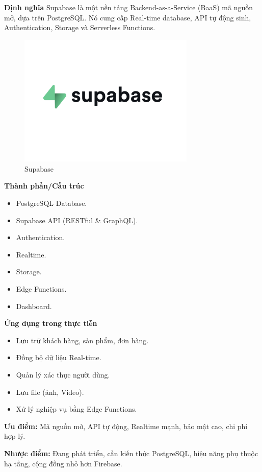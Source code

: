 \textbf{Định nghĩa}
Supabase là một nền tảng Backend-as-a-Service (BaaS) mã nguồn mở, dựa trên PostgreSQL. Nó cung cấp Real-time database, API tự động sinh, Authentication, Storage và Serverless Functions.
\begin{figure}[h!]
    \centering
    \includegraphics[width=0.75\textwidth]{img/Picture8.png}
    
    \caption{Supabase}
    \label{fig:supabase}
\end{figure}
\textbf{Thành phần/Cấu trúc}
\begin{itemize}
    \item PostgreSQL Database.
    \item Supabase API (RESTful \& GraphQL).
    \item Authentication.
    \item Realtime.
    \item Storage.
    \item Edge Functions.
    \item Dashboard.
\end{itemize}

\textbf{Ứng dụng trong thực tiễn}
\begin{itemize}
    \item Lưu trữ khách hàng, sản phẩm, đơn hàng.
    \item Đồng bộ dữ liệu Real-time.
    \item Quản lý xác thực người dùng.
    \item Lưu file (ảnh, Video).
    \item Xử lý nghiệp vụ bằng Edge Functions.
\end{itemize}


\textbf{Ưu điểm:} Mã nguồn mở, API tự động, Realtime mạnh, bảo mật cao, chi phí hợp lý. 

\textbf{Nhược điểm:} Đang phát triển, cần kiến thức PostgreSQL, hiệu năng phụ thuộc hạ tầng, cộng đồng nhỏ hơn Firebase.

